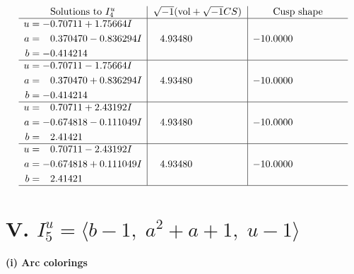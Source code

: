 \documentclass[1p]{elsarticle_modified}
\theoremstyle{definition}
\newcommand{\I}{\sqrt{-1}}
\begin{document}
$$\begin{array}{c|c|c}  
\text{Solutions to }I^u_{4}& \I (\text{vol} + \sqrt{-1}CS) & \text{Cusp shape}\\
 \hline 
\begin{aligned}
u &= -0.70711 + 1.75664 I \\
a &= \phantom{-}0.370470 - 0.836294 I \\
b &= -0.414214\phantom{ +0.000000I}\end{aligned}
 & \phantom{-}4.93480\phantom{ +0.000000I} & -10.0000\phantom{ +0.000000I} \\ \hline\begin{aligned}
u &= -0.70711 - 1.75664 I \\
a &= \phantom{-}0.370470 + 0.836294 I \\
b &= -0.414214\phantom{ +0.000000I}\end{aligned}
 & \phantom{-}4.93480\phantom{ +0.000000I} & -10.0000\phantom{ +0.000000I} \\ \hline\begin{aligned}
u &= \phantom{-}0.70711 + 2.43192 I \\
a &= -0.674818 - 0.111049 I \\
b &= \phantom{-}2.41421\phantom{ +0.000000I}\end{aligned}
 & \phantom{-}4.93480\phantom{ +0.000000I} & -10.0000\phantom{ +0.000000I} \\ \hline\begin{aligned}
u &= \phantom{-}0.70711 - 2.43192 I \\
a &= -0.674818 + 0.111049 I \\
b &= \phantom{-}2.41421\phantom{ +0.000000I}\end{aligned}
 & \phantom{-}4.93480\phantom{ +0.000000I} & -10.0000\phantom{ +0.000000I}\\
 \hline 
 \end{array}$$\newpage\newpage\renewcommand{\arraystretch}{1}
\centering \section*{V. $I^u_{5}= \langle b-1,\;a^2+a+1,\;u-1 \rangle$}
\flushleft \textbf{(i) Arc colorings}\\
\end{document}
